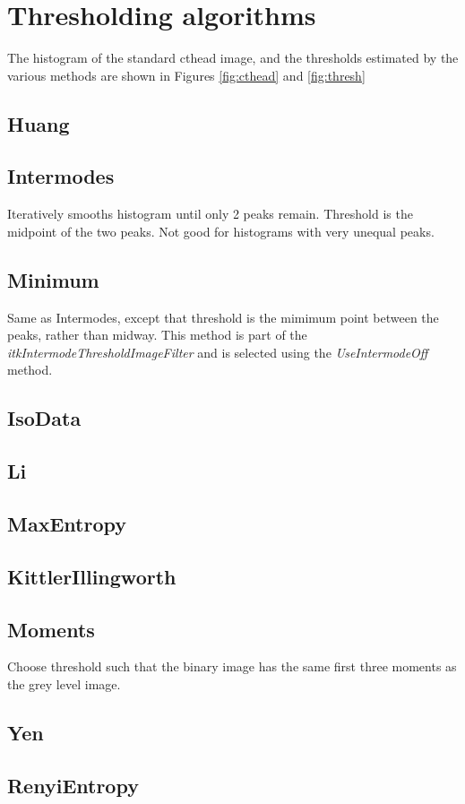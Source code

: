 \documentclass{InsightArticle}
\begin{document}
\section{Thresholding algorithms}
The histogram of the standard cthead image, and the thresholds
estimated by the various methods are shown in Figures \ref{fig:cthead}
and \ref{fig:thresh}
\subsection{Huang}
\subsection{Intermodes}
Iteratively smooths histogram until only 2 peaks remain. Threshold is
the midpoint of the two peaks. Not good for histograms with very
unequal peaks.
\subsection{Minimum}
Same as Intermodes, except that threshold is the mimimum point between
the peaks, rather than midway. This method is part of the {\em
  itkIntermodeThresholdImageFilter} and is selected using the
{\em UseIntermodeOff} method.
\subsection{IsoData}

\subsection{Li}
\subsection{MaxEntropy}

\subsection{KittlerIllingworth}
\subsection{Moments}
Choose threshold such that the binary image has the same first three moments as the grey level image.
\subsection{Yen}
\subsection{RenyiEntropy}
\end{document}
